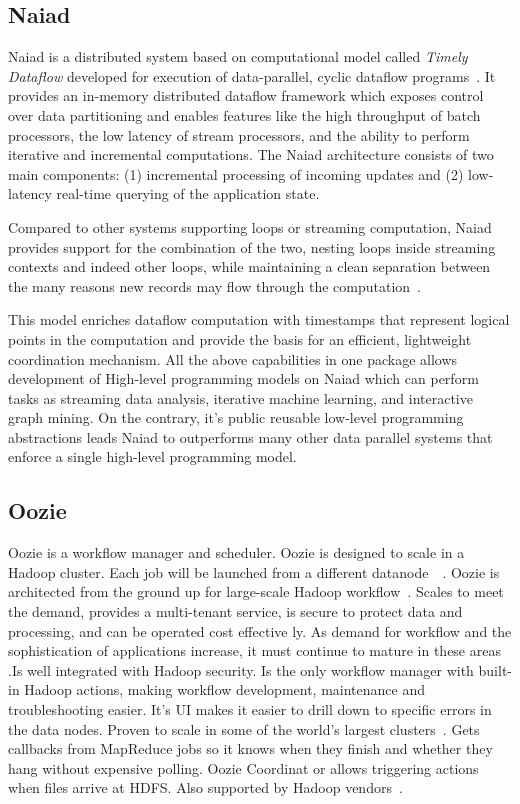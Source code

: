     \pv

    
\subsection{Naiad \vc}

Naiad is a distributed system based on computational model called
\textit{Timely Dataflow} developed for execution of data-parallel,
cyclic dataflow programs~\cite{paper-naiad}.  It provides an in-memory
distributed dataflow framework which exposes control over data
partitioning and enables features like the high throughput of batch
processors, the low latency of stream processors, and the ability to
perform iterative and incremental computations. The Naiad architecture
consists of two main components: (1) incremental processing of
incoming updates and (2) low-latency real-time querying of the
application state.
    
Compared to other systems supporting loops or streaming computation,
Naiad provides support for the combination of the two, nesting loops
inside streaming contexts and indeed other loops, while maintaining a
clean separation between the many reasons new records may flow through
the computation~\cite{www-naiad}.
    
    This model enriches dataflow computation with timestamps that
    represent logical points in the computation and provide the basis
    for an efficient, lightweight coordination mechanism.  All the
    above capabilities in one package allows development of High-level
    programming models on Naiad which can perform tasks as streaming
    data analysis, iterative machine learning, and interactive graph
    mining. On the contrary, it's public reusable low-level
    programming abstractions leads Naiad to outperforms many other
    data parallel systems that enforce a single high-level programming
    model.

    \pv
    
\subsection{Oozie}

Oozie is a workflow manager and scheduler. Oozie is designed to scale
in a Hadoop cluster. Each job will be launched from a different
datanode~\cite{paper-Oozie}~\cite{www-Oozie1}. Oozie is architected
from the ground up for large-scale Hadoop workflow~\cite{www-Oozie2}.
Scales to meet the demand, provides a multi-tenant service, is secure
to protect data and processing, and can be operated cost effective
ly. As demand for workflow and the sophistication of applications
increase, it must continue to mature in these areas
\cite{paper-Oozie}.Is well integrated with Hadoop security. Is the
only workflow manager with built-in Hadoop actions, making workflow
development, maintenance and troubleshooting easier. It's UI makes it
easier to drill down to specific errors in the data nodes. Proven to
scale in some of the world's largest clusters~\cite{paper-Oozie}. Gets
callbacks from MapReduce jobs so it knows when they finish and whether
they hang without expensive polling. Oozie Coordinat or allows
triggering actions when files arrive at HDFS. Also supported by Hadoop
vendors~\cite{paper-Oozie}.


